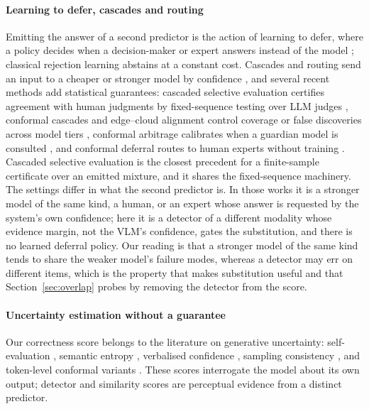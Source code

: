 \paragraph{Learning to defer, cascades and routing}
Emitting the answer of a second predictor is the action of learning to defer, where a policy decides when a decision-maker or expert answers instead of
the model \citep{madras2018defer,mozannar2020defer}; classical rejection learning \citep{cortes2016} abstains at a constant cost. Cascades and
routing send an input to a cheaper or stronger model by confidence \citep{chen2024frugalgpt}, and several recent methods add statistical guarantees:
cascaded selective evaluation certifies agreement with human judgments by fixed-sequence testing over LLM judges \citep{jung2025trust}, conformal cascades
and edge--cloud alignment control coverage or false discoveries across model tiers \citep{dou2026conformalcascade,huang2025edgecloud}, conformal arbitrage
calibrates when a guardian model is consulted \citep{overman2025arbitrage}, and conformal deferral routes to human experts without training
\citep{bary2025noneed}. Cascaded selective evaluation is the closest precedent for a finite-sample certificate over an emitted mixture, and it shares the fixed-sequence
machinery. The settings differ in what the second predictor is. In those works it is a stronger model of the same kind, a human, or an expert whose answer is
requested by the system's own confidence; here it is a detector of a different modality whose evidence margin, not the VLM's confidence, gates the substitution, and
there is no learned deferral policy. Our reading is that a stronger model of the same kind tends to share the weaker model's failure modes, whereas a detector
may err on different items, which is the property that makes substitution useful and that Section~\ref{sec:overlap} probes by removing the detector from the score.

\paragraph{Uncertainty estimation without a guarantee}
Our correctness score belongs to the literature on generative uncertainty: self-evaluation
\citep{kadavath2022}, semantic entropy \citep{kuhn2023,farquhar2024}, verbalised confidence
\citep{lin2022}, sampling consistency \citep{manakul2023,wang2023selfconsistency}, and token-level
conformal variants \citep{tecp,cover}. These scores interrogate the model about its own output;
detector and similarity scores are perceptual evidence from a distinct predictor.

